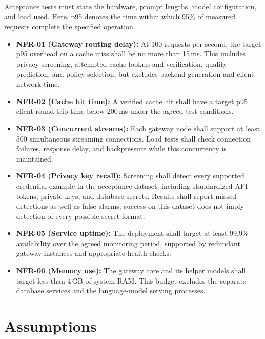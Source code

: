 Acceptance tests must state the hardware, prompt lengths, model configuration, and load used. Here, p95 denotes the time within which 95\% of measured requests complete the specified operation.
\begin{itemize}
    \item \textbf{NFR-01 (Gateway routing delay):} At 100 requests per second, the target p95 overhead on a cache miss shall be no more than 15\,ms. This includes privacy screening, attempted cache lookup and verification, quality prediction, and policy selection, but excludes backend generation and client network time.
    \item \textbf{NFR-02 (Cache hit time):} A verified cache hit shall have a target p95 client round-trip time below 200\,ms under the agreed test conditions.
    \item \textbf{NFR-03 (Concurrent streams):} Each gateway node shall support at least 500 simultaneous streaming connections. Load tests shall check connection failures, response delay, and backpressure while this concurrency is maintained.
    \item \textbf{NFR-04 (Privacy key recall):} Screening shall detect every supported credential example in the acceptance dataset, including standardized API tokens, private keys, and database secrets. Results shall report missed detections as well as false alarms; success on this dataset does not imply detection of every possible secret format.
    \item \textbf{NFR-05 (Service uptime):} The deployment shall target at least 99.9\% availability over the agreed monitoring period, supported by redundant gateway instances and appropriate health checks.
    \item \textbf{NFR-06 (Memory use):} The gateway core and its helper models shall target less than 4\,GB of system RAM. This budget excludes the separate database services and the language-model serving processes.
\end{itemize}

\section{Assumptions}
\label{sec:assumptions}

